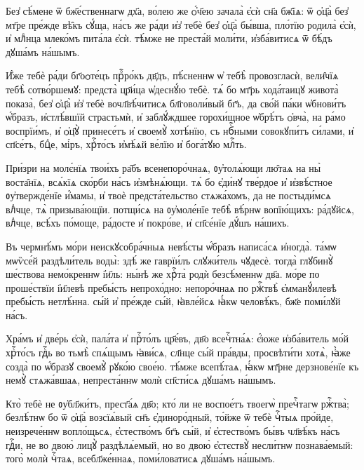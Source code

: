 \cuLettrine
Без̾ сѣ́мене ѿ бж҃е́ственнагѡ дх҃а, во́лею же ѻ҆́ч҃ею  зачала̀ є҆сѝ сн҃а бж҃їѧ: ѿ ѻ҆ц҃а̀ без̾ мт҃ре пре́жде  вѣ̑къ сꙋ́ща, на́съ же ра́ди и҆з̾ тебѐ без̾ ѻ҆ц҃а̀  бы́вша, пло́тїю родила̀   є҆сѝ, и҆ млⷣнца млеко́мъ пита́ла є҆сѝ. тѣ́мже не  преста́й моли́ти, и҆зба́витисѧ ѿ бѣ́дъ дꙋша́мъ на́шымъ. 
%

\cuLettrine
И҆́же тебѐ ра́ди бг҃оѻте́цъ прⷪ҇ро́къ дв҃дъ, пѣ́сненнѡ ѡ҆  тебѣ̀ провозгласѝ, вели̑чїѧ тебѣ̀ сотво́ршемꙋ: предста̀  цр҃и́ца ѡ҆деснꙋ́ю тебѐ. тѧ́ бо мт҃рь хода́таицꙋ живота̀  показа̀, без̾ ѻ҆ц҃а̀ и҆з̾ тебѐ вочл҃вѣ́читисѧ  бл҃говоли́вый бг҃ъ, да сво́й па́ки ѡ҆бнови́тъ ѡ҆́бразъ,  и҆стлѣ́вшїй страстьмѝ, и҆ заблꙋ́ждшее горохи́щное  ѡ҆брѣ́тъ ѻ҆вча̀, на ра́мо воспрїи́мъ, и҆ ѻ҆ц҃ꙋ̀  принесе́тъ и҆ своемꙋ̀ хотѣ́нїю, съ нбⷭ҇ными совокꙋпи́тъ  си́лами, и҆ сп҃се́тъ, бцⷣе, мі́ръ, хрⷭ҇то́съ и҆мѣ́ѧй  ве́лїю и҆ бога́тꙋю млⷭ҇ть. 
%

\cuLettrine
При́зри на молє́нїѧ твои́хъ ра̑бъ всенепоро́чнаѧ,  ᲂу҆толѧ́ющи лю̑таѧ на ны̀   воста̑нїѧ, всѧ́кїѧ ско́рби на́съ и҆змѣнѧ́ющи. тѧ́ бо  є҆ди́нꙋ тве́рдое и҆ и҆звѣ́стное ᲂу҆твержде́нїе и҆́мамы,  и҆ твоѐ предста́тельство стѧжа́хомъ, да не постыди́мсѧ  влⷣчце, тѧ̀ призыва́ющїи. потщи́сѧ на ᲂу҆моле́нїе тебѣ̀  вѣ́рнѡ вопїю́щихъ: ра́дꙋйсѧ, влⷣчце, всѣ́хъ по́моще,  ра́досте и҆ покро́ве, и҆ сп҃се́нїе дꙋ́шъ на́шихъ. 
%

\cuLettrine
Въ чермнѣ́мъ мо́ри неискꙋсобра́чныѧ невѣ́сты ѡ҆́бразъ  написа́сѧ и҆ногда̀. та́мѡ мѡѷсе́й раздѣли́тель воды̀:  здѣ́ же гаврїи́лъ слꙋжи́тель чꙋдесѐ. тогда̀ глꙋбинꙋ̀  ше́ствова немо́креннѡ і҆и҃ль: ны́нѣ же хрⷭ҇та̀ родѝ  безсѣ́меннѡ дв҃а. мо́ре по проше́ствїи і҆и҃левѣ пребы́сть  непрохо́дно: непоро́чнаѧ по ржⷭ҇твѣ̀ є҆мманꙋ́илевѣ  пребы́сть нетлѣ́нна. сы́й и҆ пре́жде сы́й, ꙗ҆вле́йсѧ  ꙗ҆́кѡ человѣ́къ, бж҃е поми́лꙋй на́съ.  
%

\cuLettrine
Хра́мъ и҆ две́рь є҆сѝ, пала́та и҆ прⷭ҇то́лъ цр҃е́въ, дв҃о  всечⷭ҇тна́ѧ: є҆́юже и҆зба́витель мо́й хрⷭ҇то́съ гдⷭ҇ь во  тьмѣ̀ спѧ́щымъ ꙗ҆ви́сѧ, сл҃нце сы́й пра́вды, просвѣти́ти  хотѧ̀, ꙗ҆̀же созда̀ по ѡ҆́бразꙋ своемꙋ̀ рꙋко́ю свое́ю.  тѣ́мже всепѣ́таѧ, ꙗ҆́кѡ мт҃рне дерзнове́нїе къ немꙋ̀  стѧжа́вшаѧ, непреста́ннѡ молѝ сп҃сти́сѧ дꙋша́мъ на́шымъ. 
%

\cuLettrine
Кто̀ тебѐ не ᲂу҆бл҃жи́тъ, прест҃а́ѧ дв҃о; кто́ ли не  воспое́тъ твоегѡ̀ пречⷭ҇тагѡ ржⷭ҇тва̀; безлѣ́тнѡ бо ѿ  ѻ҆ц҃а̀ возсїѧ́вый сн҃ъ є҆диноро́дный, то́йже ѿ тебѐ  чⷭ҇тыѧ про́йде, неизрече́ннѡ вопло́щьсѧ, є҆стество́мъ бг҃ъ  сы́й, и҆ є҆стество́мъ бы́въ чл҃вѣ́къ на́съ гдⷭ҇и, не во  двою̀ лицꙋ̀ раздѣлѧ́емый, но во двою̀ є҆стєствꙋ̀  несли́тнѡ познава́емый: того̀   молѝ чⷭ҇таѧ, всебл҃же́ннаѧ, поми́ловатисѧ дꙋша́мъ на́шымъ.  
%

